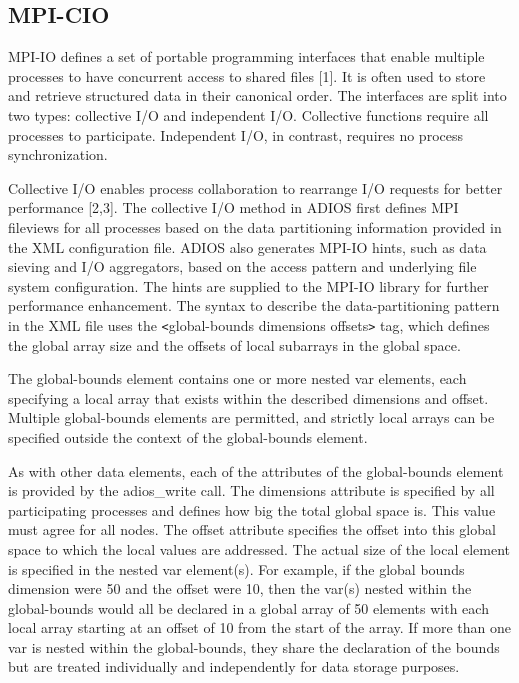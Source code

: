 \subsection{MPI-CIO}

MPI-IO defines a set of portable programming interfaces that enable multiple processes 
to have concurrent access to shared files [1]. It is often used to store and retrieve 
structured data in their canonical order. The interfaces are split into two types: 
collective I/O and independent I/O. Collective functions require all processes 
to participate. Independent I/O, in contrast, requires no process synchronization.

Collective I/O enables process collaboration to rearrange I/O requests for better 
performance [2,3]. The collective I/O method in ADIOS first defines MPI fileviews 
for all processes based on the data partitioning information provided in the XML 
configuration file. ADIOS also generates MPI-IO hints, such as data sieving and 
I/O aggregators, based on the access pattern and underlying file system configuration. 
The hints are supplied to the MPI-IO library for further performance enhancement. 
The syntax to describe the data-partitioning pattern in the XML file uses the \texttt{<}global-bounds 
dimensions offsets\texttt{>} tag, which defines the global array size and the offsets 
of local subarrays in the global space. 

The global-bounds element contains one or more nested var elements, each specifying 
a local array that exists within the described dimensions and offset.  Multiple 
global-bounds elements are permitted, and strictly local arrays can be specified 
outside the context of the global-bounds element.

As with other data elements, each of the attributes of the global-bounds element 
is provided by the adios\_write call. The dimensions attribute is specified by 
all participating processes and defines how big the total global space is.  This 
value must agree for all nodes. The offset attribute specifies the offset into 
this global space to which the local values are addressed. The actual size of the 
local element is specified in the nested var element(s).  For example, if the global 
bounds dimension were 50 and the offset were 10, then the var(s) nested within 
the global-bounds would all be declared in a global array of 50 elements with each 
local array starting at an offset of 10 from the start of the array.  If more than 
one var is nested within the global-bounds, they share the declaration of the bounds 
but are treated individually and independently for data storage purposes. 

